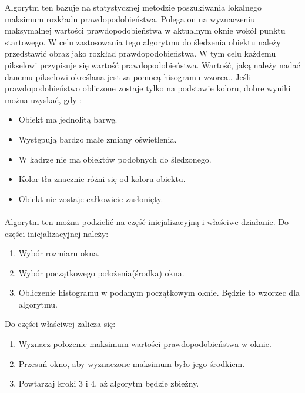 Algorytm ten bazuje na statystycznej metodzie poszukiwania lokalnego maksimum rozkładu prawdopodobieństwa. 
Polega on na wyznaczeniu maksymalnej wartości prawdopodobieństwa w aktualnym oknie wokół punktu startowego.
W celu zastosowania tego algorytmu do śledzenia obiektu należy przedstawić obraz jako rozkład prawdopodobieństwa.
W tym celu każdemu pikselowi przypisuje się wartość prawdopodobieństwa.
Wartość, jaką należy nadać danemu pikselowi określana jest za pomocą hisogramu wzorca.\cite{CMS}.
Jeśli prawdopodobieństwo obliczone zostaje tylko na podstawie koloru, dobre wyniki można uzyskać, gdy \cite{CMS}:
\begin{itemize}
\item Obiekt ma jednolitą barwę.
\item Występują bardzo małe zmiany oświetlenia.
\item W kadrze nie ma obiektów podobnych do śledzonego.
\item Kolor tła znacznie różni się od koloru obiektu.
\item Obiekt nie zostaje całkowicie zasłonięty.
\end{itemize}
\paragraph*{}
Algorytm ten można podzielić na część inicjalizacyjną i właściwe działanie. Do części inicjalizacyjnej należy:
\begin{enumerate}
\item Wybór rozmiaru okna.
\item Wybór początkowego położenia(środka) okna.
\item Obliczenie histogramu w podanym początkowym oknie. Będzie to wzorzec dla algorytmu.
\end{enumerate}
Do części właściwej zalicza się:
\begin{enumerate}
\item Wyznacz położenie maksimum wartości prawdopodobieństwa w oknie.
\item Przesuń okno, aby wyznaczone maksimum było jego środkiem.
\item Powtarzaj kroki 3 i 4, aż algorytm będzie zbieżny.
\end{enumerate}
